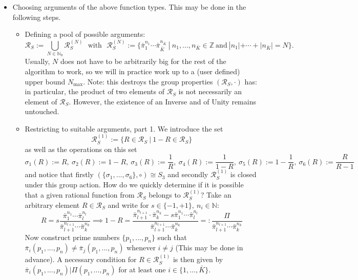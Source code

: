 \documentclass[10pt]{article}
\newcommand*{\IZ}{\mathbb{Z}}
\newcommand*{\IN}{\mathbb{N}}
\newcommand*{\rff}{\mathcal{R}}
\begin{document}
\begin{itemize}
\item[(v)] Choosing arguments of the above function types. This may be done in the following steps.
\begin{itemize}
\item[(v.i)] Defining a pool of possible arguments:
\begin{equation*}
\rff_S := \bigcup_{N \in \IN_0} \mathcal{R}_S^{(N)} \ \ \ \mathrm{with} \ \ \ \mathcal{R}_S^{(N)} := \{ \bar \pi_1^{n_1} \cdots \bar \pi_{\bar K}^{n_{\bar K}} \ | \ n_1, ..., n_{\bar K} \in \IZ \ \mathrm{and} \ |n_1| + \cdots + |n_{\bar K}| = N \}.
\end{equation*}
Usually, $N$ does not have to be arbitrarily big for the rest of the algorithm to work, so we will in practice work up to a (user defined) upper bound $N_{\max}$. Note: this destroys the group properties $(\rff_S, \cdot)$ has: in particular, the product of two elements of $\rff_S$ is not necessarily an element of $\rff_S$. However, the existence of an Inverse and of Unity remains untouched.
\item[(v.ii)] Restricting to suitable arguments, part 1. We introduce the set
\begin{equation*}
\rff_{S}^{(1)} := \{R \in \rff_S \ | \ 1 - R \in \rff_S\}
\end{equation*}
as well as the operations on this set
\begin{equation*}
\sigma_1(R) := R, \ \sigma_2(R) := 1 - R, \ \sigma_3(R) := \frac{1}{R}, \ \sigma_4(R) := \frac{1}{1-R}, \ \sigma_5(R) := 1 - \frac{1}{R}, \ \sigma_6(R) := \frac{R}{R-1}
\end{equation*}
and notice that firstly $(\{\sigma_1, ..., \sigma_6\}, \circ) \cong S_3$ and secondly $\rff_S^{(1)}$ is closed under this group action. How do we quickly determine if it is possible that a given rational function from $\rff_S$ belongs to $\rff_{S}^{(1)}$? Take an arbitrary element $R \in \rff_S$ and write for $s \in \{-1, +1\}, \ n_i \in \IN$:
\begin{equation*}
R = s \frac{\bar \pi_1^{n_1} \cdots \bar \pi_l^{n_l}}{\bar \pi_{l+1}^{n_{l+1}} \cdots \bar \pi_{k}^{n_k}} \implies 1 - R = \frac{\bar \pi_{l+1}^{n_{l+1}} \cdot \bar \pi_{k}^{n_k} - s \bar \pi_1^{n_1} \cdots \bar \pi_l^{n_l}}{\bar \pi_{l+1}^{n_{l+1}} \cdots \bar \pi_k^{n_k}} =: \frac{\Pi}{\bar \pi_{l+1}^{n_{l+1}} \cdots \bar \pi_k^{n_k}}
\end{equation*}
Now construct prime numbers $\{p_1, ..., p_n\}$ such that $\bar \pi_i(p_1, ..., p_n) \neq \bar \pi_j (p_1, ..., p_n)$ whenever $i \neq j$ (This may be done in advance). A necessary condition for $R \in \rff_S^{(1)}$ is then given by $\bar \pi_i(p_1, ..., p_n) | \Pi(p_1, ..., p_n)$ for at least one $i \in \{1, ..., \bar K\}$.


\end{itemize}
\end{itemize}
\end{document}
